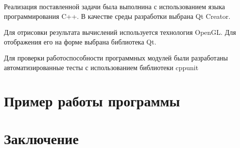 \documentclass[a4paper, 12pt]{article}
\begin{document}
Реализация поставленной задачи была выполнина с использованием языка
программирования C++. В качестве среды разработки выбрана Qt Creator.

Для отрисовки результата вычислений используется технология OpenGL. Для
отображения его на форме выбрана библиотека Qt.

Для проверки работоспособности программных модулей были разработаны
автоматизированные тесты с использованием библиотеки cppunit

\clearpage
\section{Пример работы программы}

\clearpage
\section{Заключение}
\end{document}
